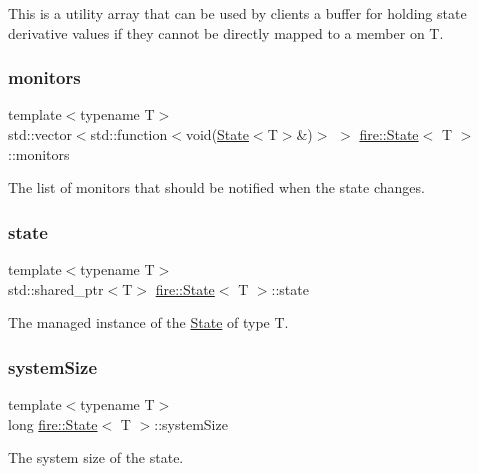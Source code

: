 This is a utility array that can be used by clients a buffer for holding state derivative values if they cannot be directly mapped to a member on T. \mbox{\label{a00818_ae1571b0a1c82060e525ce6ce2119ae5e}} 
\subsubsection{\texorpdfstring{monitors}{monitors}}
{\footnotesize\ttfamily template$<$typename T$>$ \\
std\+::vector$<$std\+::function$<$void(\hyperlink{a00818}{State}$<$T$>$\&)$>$ $>$ \hyperlink{a00818}{fire\+::\+State}$<$ T $>$\+::monitors\hspace{0.3cm}{\ttfamily [protected]}}

The list of monitors that should be notified when the state changes. \mbox{\label{a00818_a9a75139f1d613abc9fb82600757087f6}} 
\subsubsection{\texorpdfstring{state}{state}}
{\footnotesize\ttfamily template$<$typename T$>$ \\
std\+::shared\+\_\+ptr$<$T$>$ \hyperlink{a00818}{fire\+::\+State}$<$ T $>$\+::state\hspace{0.3cm}{\ttfamily [protected]}}

The managed instance of the \hyperlink{a00818}{State} of type T. \mbox{\label{a00818_a08f8f4ea745ae855ef730896efabf1ae}} 
\subsubsection{\texorpdfstring{system\+Size}{systemSize}}
{\footnotesize\ttfamily template$<$typename T$>$ \\
long \hyperlink{a00818}{fire\+::\+State}$<$ T $>$\+::system\+Size\hspace{0.3cm}{\ttfamily [protected]}}

The system size of the state. \mbox{\label{a00818_a4985617940993cea772a7fc977c87237}} 
